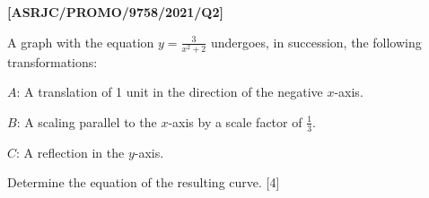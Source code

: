 \item \textbf{{[}ASRJC/PROMO/9758/2021/Q2{]} }

A graph with the equation $y=\frac{3}{x^{2}+2}$ undergoes, in succession,
the following transformations: 

$A$: A translation of 1 unit in the direction of the negative $x$-axis. 

$B$: A scaling parallel to the $x$-axis by a scale factor of $\frac{1}{3}$. 

$C$: A reflection in the $y$-axis. 

Determine the equation of the resulting curve. \hfill{}{[}4{]}